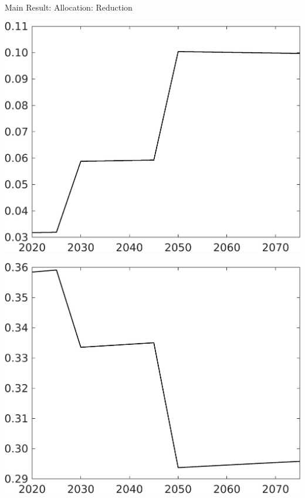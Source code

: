 \documentclass[11pt,aspectratio=169]{beamer}
\begin{document}
\begin{frame}{Main Result: Allocation: Reduction}
\begin{minipage}[]{0.32\textwidth}
\end{minipage}
\begin{minipage}[]{0.32\textwidth}
	\includegraphics[width=1\textwidth]{../codding_model/own_basedOnFried/optimalPol_elastS_DisuSci/figures/all_1705/Single_OPT_T_NoTaus_sg_spillover0_sep1_BN0_ineq0_red0_etaa0.79.png}
\end{minipage}
\begin{minipage}[]{0.32\textwidth}
	\includegraphics[width=1\textwidth]{../codding_model/own_basedOnFried/optimalPol_elastS_DisuSci/figures/all_1705/Single_OPT_T_NoTaus_sn_spillover0_sep1_BN0_ineq0_red0_etaa0.79.png}

\end{minipage}
\end{frame}
\end{document}
